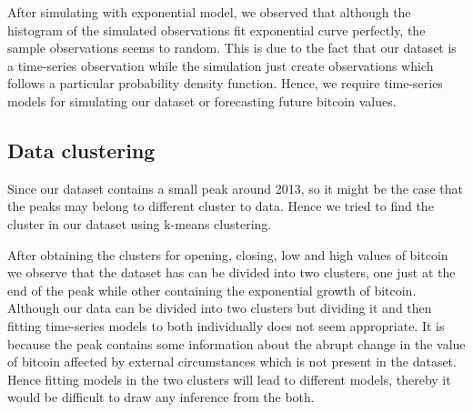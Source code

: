 \documentclass{article}
\begin{document}
After simulating with exponential model, we observed that although the histogram of the simulated observations fit exponential curve perfectly, the sample observations seems to random. This is due to the fact that our dataset is a time-series observation while the simulation just create observations which follows a particular probability density function. Hence, we require time-series models for simulating our dataset or forecasting future bitcoin values.

\subsection{Data clustering}
Since our dataset contains a small peak around 2013, so it might be the case that the peaks may belong to different cluster to data. Hence we tried to find the cluster in our dataset using k-means clustering.

\begin{Schunk}
\end{Schunk}

After obtaining the clusters for opening, closing, low and high values of bitcoin we observe that the dataset has can be divided into two clusters, one just at the end of the peak while other containing the exponential growth of bitcoin. Although our data can be divided into two clusters but dividing it and then fitting time-series models to both individually does not seem appropriate. It is because the peak contains some information about the abrupt change in the value of bitcoin affected by external circumstances which is not present in the dataset. Hence fitting models in the two clusters will lead to different models, thereby it would be difficult to draw any inference from the both.
\end{document}
